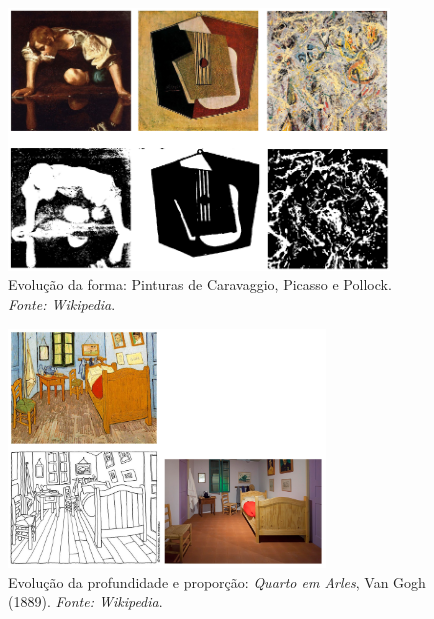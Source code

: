 \documentclass{beamer}
\begin{document}

\begin{frame}

\begin{figure}
\begin{center}
    \includegraphics[width=0.9\textwidth]{figs/comp_formas.png}
  \end{center}
  \caption{Evolução da forma: Pinturas de Caravaggio, Picasso e Pollock. \textit{Fonte: Wikipedia}.
        }
  \label{fig:comp_formas}
\end{figure}

\end{frame}

\begin{frame}

\begin{figure}
\begin{center}
    \includegraphics[width=0.75\textwidth]{figs/fig_profundidade1.png}
  \end{center}
  \caption{Evolução da profundidade e proporção: \emph{Quarto em Arles}, Van Gogh (1889). \textit{Fonte: Wikipedia}.}
  \label{fig:profundidade}
\end{figure}

\end{frame}
\end{document}
